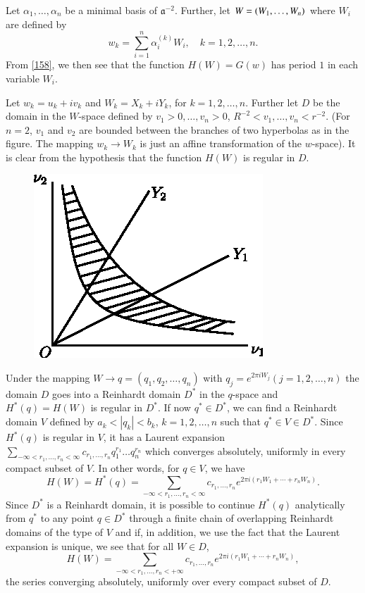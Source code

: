 Let $\alpha_{1},\ldots,\alpha_{n}$ be a minimal basis of
$\mathfrak{a}^{-2}$. Further, let $W=(W_{1},\ldots,\break W_{n})$ where
$W_{i}$ are defined by
$$
w_{k}=\sum^{n}_{i=1}\alpha^{(k)}_{i}W_{i},\quad k=1,2,\ldots,n.
$$
From \eqref{158}, we then see that the function $H(W)=G(w)$ has period
$1$ in each variable $W_{i}$.

Let $w_{k}=u_{k}+iv_{k}$ and $W_{k}=X_{k}+iY_{k}$, for
$k=1,2,\ldots,n$. Further let $D$ be the domain in the $W$-space
defined by $v_{1}>0,\ldots,v_{n}>0$,
$R^{-2}<v_{1},\ldots,v_{n}<r^{-2}$. (For $n=2$, $v_{1}$ and $v_{2}$
are bounded between the branches of two hyperbolas as in the
figure. The mapping $w_{k}\to W_{k}$ is just an affine transformation
of the $w$-space). It is clear from the hypothesis that the function
$H(W)$ is regular in $D$.


\begin{figure}[H]
\centering
\includegraphics{figure2.eps}
\end{figure}

Under the mapping $W\to q=(q_{1},q_{2},\ldots,q_{n})$ with
$q_{j}=e^{2\pi iW_{j}}(j=1,2,\ldots,n)$ the domain $D$ goes into a
Reinhardt domain $D^{\ast}$ in the $q$-space and $H^{\ast}(q)=H(W)$ is
regular in $D^{\ast}$. If now $q^{\ast}\in D^{\ast}$, we can find a
Reinhardt domain $V$ defined by $a_{k}<|q_{k}|<b_{k}$,
$k=1,2,\ldots,n$ such that $q^{\ast}\in V\in D^{\ast}$. Since
$H^{\ast}(q)$ is regular in $V$, it has a Laurent
expansion\pageoriginale
$\sum\limits_{-\infty<r_{1},\ldots,r_{n}<\infty}c_{r_{1},\ldots,r_{n}}q^{r_{1}}_{1}\ldots
q^{r_{n}}_{n}$ which converges absolutely, uniformly in every compact
subset of $V$. In other words, for $q\in V$, we have
$$
H(W)=H^{\ast}(q)=\sum_{-\infty<r_{1},\ldots,r_{n}<\infty}c_{r_{1},\ldots,r_{n}}e^{2\pi
  i(r_{1}W_{1}+\cdots+r_{n}W_{n})}.
$$
Since $D^{\ast}$ is a Reinhardt domain, it is possible to continue
$H^{\ast}(q)$ analytically from $q^{\ast}$ to any point $q\in
D^{\ast}$ through a finite chain of overlapping Reinhardt domains of
the type of $V$ and if, in addition, we use the fact that the Laurent
expansion is unique, we see that for all $W\in D$, 
\begin{equation*}
H(W)=\sum_{-\infty<r_{1},\ldots,r_{n}<+\infty}c_{r_{1},\ldots,r_{n}}e^{2\pi
  i(r_{1}W_{1}+\cdots+r_{n}W_{n})},\tag{159}\label{159} 
\end{equation*}
the series converging absolutely, uniformly over every compact subset
of $D$.

